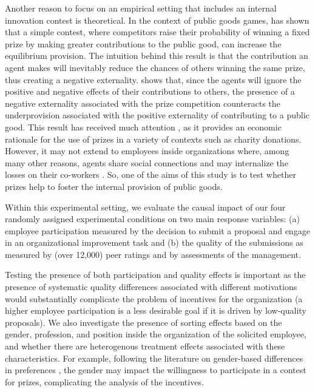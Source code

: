 \documentclass[11pt]{article}
\begin{document}
Another reason to focus on an empirical setting that includes an
internal innovation contest is theoretical. In the context of public
goods games, \citet{morgan2000financing} has shown that a simple
contest, where competitors raise their probability of winning a fixed
prize by making greater contributions to the public good, can increase
the equilibrium provision. The intuition behind this result is that the
contribution an agent makes will inevitably reduce the chances of others
winning the same prize, thus creating a negative externality.
\citet{morgan2000financing} shows that, since the agents will ignore the
positive and negative effects of their contributions to others, the
presence of a negative externality associated with the prize competition
counteracts the underprovision associated with the positive externality
of contributing to a public good. This result has received much
attention \citep{vesterlund2012voluntary}, as it provides an economic
rationale for the use of prizes in a variety of contexts such as charity
donations. However, it may not extend to employees inside organizations
where, among many other reasons, agents share social connections and may
internalize the losses on their co-workers \citep[as
in][]{bandiera2005social}. So, one of the aims of this study is to test
whether prizes help to foster the internal provision of public goods.

Within this experimental setting, we evaluate the causal impact of our
four randomly assigned experimental conditions on two main response
variables: (a) employee participation measured by the decision to submit
a proposal and engage in an organizational improvement task and (b) the
quality of the submissions as measured by (over 12,000) peer ratings and
by assessments of the management.

Testing the presence of both participation and quality effects is
important as the presence of systematic quality differences associated
with different motivations would substantially complicate the problem of
incentives for the organization (a higher employee participation is a
less desirable goal if it is driven by low-quality proposals). We also
investigate the presence of sorting effects based on the gender,
profession, and position inside the organization of the solicited
employee, and whether there are heterogenous treatment effects
associated with these characteristics. For example, following the
literature on gender-based differences in preferences
\citep{croson2004gender}, the gender may impact the willingness to
participate in a contest for prizes, complicating the analysis of the
incentives.
\end{document}
